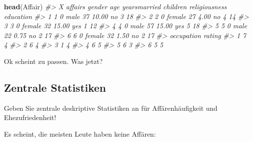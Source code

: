 \documentclass[12pt,ngerman,]{book}
\makeatletter
\newenvironment{Shaded}{\begin{snugshade}}{\end{snugshade}}
\newcommand{\KeywordTok}[1]{\textcolor[rgb]{0.13,0.29,0.53}{\textbf{{#1}}}}
\newcommand{\DataTypeTok}[1]{\textcolor[rgb]{0.13,0.29,0.53}{{#1}}}
\newcommand{\CommentTok}[1]{\textcolor[rgb]{0.56,0.35,0.01}{\textit{{#1}}}}
\newcommand{\NormalTok}[1]{{#1}}
\newenvironment{kframe}{%
\medskip{}
\setlength{\fboxsep}{.8em}
 \def\at@end@of@kframe{}%
 \ifinner\ifhmode%
  \def\at@end@of@kframe{\end{minipage}}%
  \begin{minipage}{\columnwidth}%
 \fi\fi%
 \def\FrameCommand##1{\hskip\@totalleftmargin \hskip-\fboxsep
 \colorbox{shadecolor}{##1}\hskip-\fboxsep
     \hskip-\linewidth \hskip-\@totalleftmargin \hskip\columnwidth}%
 \MakeFramed {\advance\hsize-\width
   \@totalleftmargin\z@ \linewidth\hsize
   \@setminipage}}%
 {\par\unskip\endMakeFramed%
 \at@end@of@kframe}
\renewenvironment{Shaded}{\begin{kframe}}{\end{kframe}}
\theoremstyle{definition}
\theoremstyle{definition}
\theoremstyle{remark}
\makeatother
\begin{document}
\begin{Shaded}
\begin{Highlighting}[]
\KeywordTok{head}\NormalTok{(Affair)}
\CommentTok{#>   X affairs gender age yearsmarried children religiousness education}
\CommentTok{#> 1 1       0   male  37        10.00       no             3        18}
\CommentTok{#> 2 2       0 female  27         4.00       no             4        14}
\CommentTok{#> 3 3       0 female  32        15.00      yes             1        12}
\CommentTok{#> 4 4       0   male  57        15.00      yes             5        18}
\CommentTok{#> 5 5       0   male  22         0.75       no             2        17}
\CommentTok{#> 6 6       0 female  32         1.50       no             2        17}
\CommentTok{#>   occupation rating}
\CommentTok{#> 1          7      4}
\CommentTok{#> 2          6      4}
\CommentTok{#> 3          1      4}
\CommentTok{#> 4          6      5}
\CommentTok{#> 5          6      3}
\CommentTok{#> 6          5      5}
\end{Highlighting}
\end{Shaded}

Ok scheint zu passen. Was jetzt?

\subsection{Zentrale Statistiken}\label{zentrale-statistiken}

Geben Sie zentrale deskriptive Statistiken an für Affärenhäufigkeit und
Ehezufriedenheit!

\begin{Shaded}
\end{Shaded}

Es scheint, die meisten Leute haben keine Affären:

\begin{Shaded}
\end{Shaded}
\end{document}
